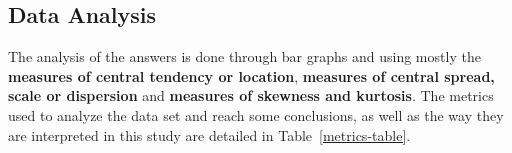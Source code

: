 \subsection{Data Analysis}

 
The analysis of the answers is done through bar graphs and using mostly the \textbf{measures of central tendency or location},  \textbf{measures of central spread, scale or dispersion} and \textbf{measures of skewness and kurtosis}. The metrics used to analyze the data set and reach some conclusions, as well as the way they are interpreted in this study are detailed in Table~\ref{metrics-table}.




